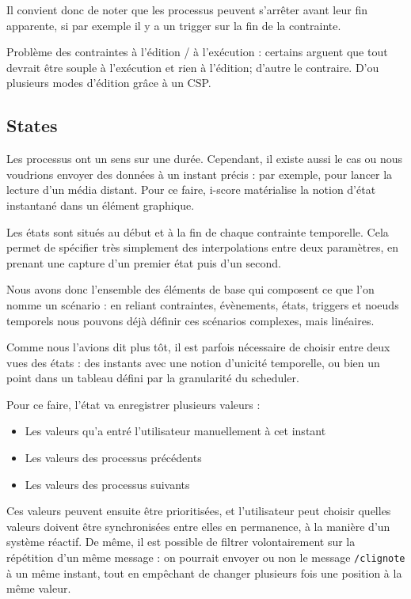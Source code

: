 \documentclass{sigchi}
\begin{document}
Il convient donc de noter que les processus peuvent s'arrêter avant leur fin apparente, si par exemple il y a un trigger sur la fin de la contrainte.

Problème des contraintes à l'édition / à l'exécution : certains arguent que tout devrait être souple à l'exécution et rien à l'édition; d'autre le contraire. D'ou plusieurs modes d'édition grâce à un CSP.

\subsection{States}
Les processus ont un sens sur une durée. Cependant, il existe aussi le cas ou nous voudrions envoyer des données à un instant précis : par exemple, pour lancer la lecture d'un média distant.
Pour ce faire, i-score matérialise la notion d'état instantané dans un élément graphique.

Les états sont situés au début et à la fin de chaque contrainte temporelle. Cela permet de spécifier très simplement des interpolations entre deux paramètres, en prenant une capture d'un premier état puis d'un second.

Nous avons donc l'ensemble des éléments de base qui composent ce que l'on nomme un scénario : en reliant contraintes, évènements, états, triggers et noeuds temporels nous pouvons déjà définir ces scénarios complexes, mais linéaires.

Comme nous l'avions dit plus tôt, il est parfois nécessaire de choisir entre deux vues des états : des instants avec une notion d'unicité temporelle, ou bien un point dans un tableau défini par la granularité du scheduler.

Pour ce faire, l'état va enregistrer plusieurs valeurs : 
\begin{itemize}
\item Les valeurs qu'a entré l'utilisateur manuellement à cet instant
\item Les valeurs des processus précédents
\item Les valeurs des processus suivants
\end{itemize}

Ces valeurs peuvent ensuite être prioritisées, et l'utilisateur peut choisir quelles valeurs doivent être synchronisées entre elles en permanence, à la manière d'un système réactif. De même, il est possible de filtrer volontairement sur la répétition d'un même message : on pourrait envoyer ou non le message \verb|/clignote| à un même instant, tout en empêchant de changer plusieurs fois une position à la même valeur. 
\end{document}
